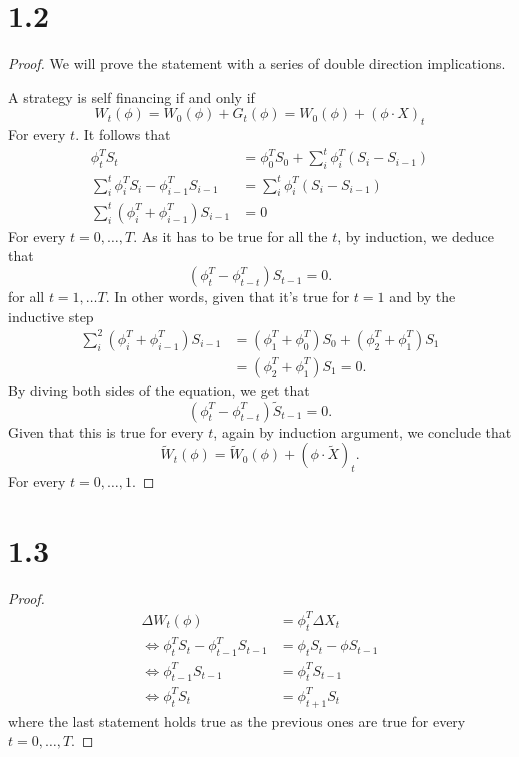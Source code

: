 \documentclass{article}
\begin{document}
\section{1.2}
\begin{proof}
  We will prove the statement with a series of double direction implications.


  A strategy is self financing if and only if
  \[
    W_t(\phi )= W_0(\phi ) + G_t(\phi ) =  W_0(\phi ) + (\phi \cdot  X)_t
  \]
  For every \(t\).
  It follows that
  \begin{align*}
    \phi _t^T S_t                                       & =\phi _0 ^TS_0 + \sum _i^t \phi_{i}^T  (S_i-S_{i-1}) \\
    \sum_{i}^t \phi _i ^T S_{i} - \phi _{i-1}^T S_{i-1} & = \sum _i^t\phi_i^T (S_i-S_{i-1})                    \\
    \sum_{i}^t(\phi _i^T + \phi_{i-1}^T )S_{i-1}        & =0
  \end{align*}
  For every \(t=0,\dots ,T\). As it has to be true for all the \(t\), by induction, we deduce that
  \[
    (\phi _t^T - \phi _{t-t}^T) S_{t-1}= 0.
  \]
  for all \(t=1,\dots T\). In other words, given that it's true for \(t=1\)
  and by the inductive step
  \begin{align*}
    \sum_{i}^2(\phi _i^T + \phi_{i-1}^T )S_{i-1} & =  (\phi _1^T + \phi_{0}^T )S_{0}+  (\phi _2^T + \phi_{1}^T )S_{1} \\
                                                 & = (\phi _2^T + \phi_{1}^T )S_{1} =0.
  \end{align*}
  By diving both sides of the equation, we get that
  \begin{equation}
    (\phi _t^T - \phi _{t-t}^T) \widetilde{S}_{t-1}= 0.
  \end{equation}
  Given that this is true for every \(t\), again by induction argument, we conclude that
  \begin{equation}
    \widetilde{W}_t(\phi ) = \widetilde{W}_0(\phi )+(\phi \cdot \widetilde{X} )_t.
  \end{equation}
  For every \(t=0,\dots ,1\).
\end{proof}

\section{1.3}
\begin{proof}
  \begin{align*}
    \Delta W_t(\phi )                                         & = \phi _t^T \Delta X_t      \\
    \iff               \phi _t ^T S_t - \phi _{t-1}^T S_{t-1} & = \phi_t S_t - \phi S_{t-1} \\
    \iff \phi _{t-1}^T S_{t-1}                                & = \phi _t^T S_{t-1}         \\
    \iff  \phi _t^T S_t                                       & = \phi _{t+1}^{T}S_t
  \end{align*}
  where the last statement holds true as the previous ones are true for every \(t =0,\dots ,T\).
\end{proof}
\end{document}
